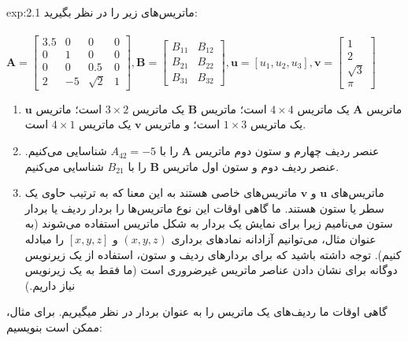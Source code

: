 {\begin{spacing}{1.5}
        \begin{example}{exp:2.1}
            \Large
            ماتریس‌های زیر را در نظر بگیرید:\\\\
            $\textbf{A}=\begin{bmatrix}
                            3.5 & 0  & 0                      & 0 \\
                            0   & 1  & 0                      & 0 \\
                            0   & 0  & 0.5                    & 0 \\
                            2   & -5 & \sqrt{\displaystyle 2} & 1
            \end{bmatrix}, \textbf{B}=\begin{bmatrix}
                                          B_{11} & B_{12} \\
                                          B_{21} & B_{22} \\
                                          B_{31} & B_{32}
            \end{bmatrix}, \textbf{u}=[u_{1},u_{2},u_{3}], \textbf{v}=\begin{bmatrix}
                                                                          1                      \\
                                                                          2                      \\
                                                                          \sqrt{\displaystyle 3} \\
                                                                          \pi
            \end{bmatrix}$
            \\
            \begin{enumerate}[label=\textbf{\arabic*}.]
                \item {ماتریس $\textbf{A}$ یک ماتریس $4\times 4$ است؛
                ماتریس $\textbf{B}$ یک ماتریس $3\times 2$ است؛
                ماتریس $\textbf{u}$ یک ماتریس $1\times 3$ است؛
                و ماتریس $\textbf{v}$ یک ماتریس $4\times 1$ است.}
                \item {عنصر ردیف چهارم و ستون دوم ماتریس $\textbf{A}$ را با $A_{42}=-5$ شناسایی می‌کنیم. عنصر ردیف دوم و ستون اول ماتریس $\textbf{B}$ را با $B_{21}$ شناسایی می‌کنیم.}
                \item {ماتریس‌های $\textbf{u}$ و $\textbf{v}$ ماتریس‌های خاصی هستند به این معنا که به ترتیب حاوی یک سطر یا ستون هستند.
                ما گاهی اوقات این نوع ماتریس‌ها را بردار ردیف یا بردار ستون می‌نامیم زیرا برای نمایش یک بردار به شکل ماتریس استفاده می‌شوند
                    (به عنوان مثال، می‌توانیم آزادانه نمادهای برداری $(x, y, z)$ و $[x, y, z]$ را مبادله کنیم).
                    توجه داشته باشید که برای بردارهای ردیف و ستون، استفاده از یک زیرنویس دوگانه برای نشان دادن عناصر ماتریس غیر‌ضروری است (ما فقط به یک زیرنویس نیاز داریم.)}
            \end{enumerate}
            گاهی اوقات ما ردیف‌های یک ماتریس را به عنوان بردار در نظر میگیریم. برای مثال، ممکن است بنویسیم:


\end{example}
\end{spacing}}
